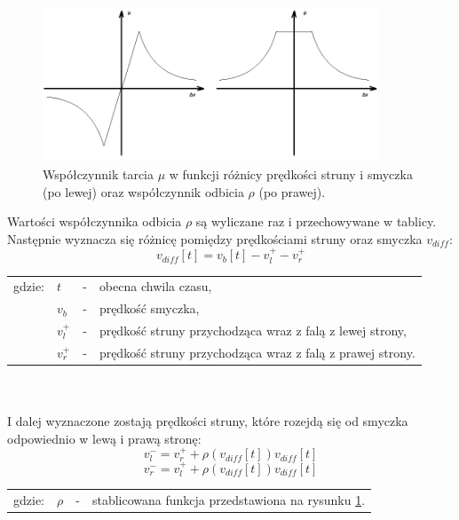 \begin{figure}[H]
	\centering
	\includegraphics[width=10cm]{grafiki/tarcie2}
	\captionsetup{justification=centering}
	\caption{Współczynnik tarcia $\mu$ w funkcji różnicy prędkości struny i smyczka (po lewej) oraz współczynnik odbicia $\rho$ (po prawej).}
	\label{rys:tarcie}
\end{figure}

Wartości współczynnika odbicia $\rho$ są wyliczane raz i przechowywane w tablicy. Następnie wyznacza się różnicę pomiędzy prędkościami struny oraz smyczka $v_{diff}$:
\begin{equation} \label{equ:wzor1}
v_{diff}[t] = v_b[t] - v_{l}^{+} - v_{r}^{+}
\end{equation}
\begin{tabular}{ l l l l}
	gdzie: & $t$ &  - & obecna chwila czasu, \\
	&	$v_b$ & - &  prędkość smyczka, \\
	&	$v_{l}^{+}$ & - & prędkość struny przychodząca wraz z falą z lewej strony,\\
	&	$v_{r}^{+}$ & - &  prędkość struny przychodząca wraz z falą z prawej strony.\\
\end{tabular} \\ \\
I dalej wyznaczone zostają prędkości struny, które rozejdą się od smyczka odpowiednio w lewą i prawą stronę:
\begin{equation} \label{equ:wzor2}
v_{l}^{-} = v_r^{+} +  \rho(v_{diff}[t])v_{diff}[t]
\end{equation}
\begin{equation} \label{equ:wzor3}
v_{r}^{-} = v_l^{+} +  \rho(v_{diff}[t])v_{diff}[t]
\end{equation}
\begin{tabular}{ l l l l}
	gdzie: & $\rho$ &  - & stablicowana funkcja przedstawiona na rysunku \ref{rys:tarcie}. \\
	
\end{tabular}
\vspace{6pt}

